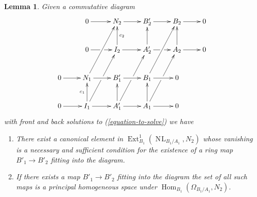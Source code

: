 \documentclass{stacks-project}
\theoremstyle{plain}
\newtheorem{lemma}[subsection]{Lemma}
\theoremstyle{definition}
\theoremstyle{remark}
\numberwithin{equation}{subsection}
\def\Hom{\mathop{\mathrm{Hom}}\nolimits}
\def\Ext{\mathop{\mathrm{Ext}}\nolimits}
\def\NL{\mathop{N\!L}\nolimits}
\begin{document}
\begin{lemma}
\label{lemma-huge-diagram}
Given a commutative diagram
$$
\xymatrix{
& 0 \ar[r] & N_2 \ar[r] & B'_2 \ar[r] & B_2 \ar[r] & 0 \\
& 0 \ar[r]|\hole & I_2 \ar[u]_{c_2} \ar[r] &
A'_2 \ar[u] \ar[r]|\hole & A_2 \ar[u] \ar[r] & 0 \\
0 \ar[r] & N_1 \ar[ruu] \ar[r] & B'_1 \ar[r] & B_1 \ar[ruu] \ar[r] & 0 \\
0 \ar[r] & I_1 \ar[ruu]|\hole \ar[u]^{c_1} \ar[r] &
A'_1 \ar[ruu]|\hole \ar[u] \ar[r] & A_1 \ar[ruu]|\hole \ar[u] \ar[r] & 0
}
$$
with front and back solutions to (\ref{equation-to-solve}) we have
\begin{enumerate}
\item There exist a canonical element in
$\Ext^1_{B_1}(\NL_{B_1/A_1}, N_2)$
whose vanishing is a necessary and sufficient condition for the existence
of a ring map $B'_1 \to B'_2$ fitting into the diagram.
\item If there exists a map $B'_1 \to B'_2$ fitting into the diagram
the set of all such maps is a principal homogeneous space under
$\Hom_{B_1}(\Omega_{B_1/A_1}, N_2)$.
\end{enumerate}
\end{lemma}
\end{document}
